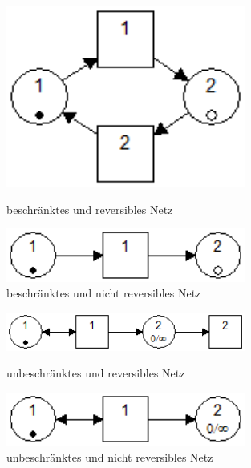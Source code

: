 \documentclass[10pt]{scrartcl}
\begin{document}
\begin{enumerate}
\begin{figure}
\begin{minipage}[hbt]{7cm}
	\centering
	\includegraphics[width=0.7\textwidth]{Bilder/3_beschraenkt_und_reversibel.png}
	\caption{beschränktes und reversibles Netz}
	\label{fig:BR}
\end{minipage}
\hfill
\begin{minipage}[hbt]{7cm}
	\centering
	\includegraphics[width=0.7\textwidth]{Bilder/3_beschraenkt_nicht_reversibel.png}
	\caption{beschränktes und nicht reversibles Netz}
	\label{fig:BnR}
\end{minipage}
\end{figure}
\begin{figure}
\begin{minipage}[hbt]{7cm}
	\centering
	\includegraphics[width=0.7\textwidth]{Bilder/3_unbeschraenkt_und_reversibel.png}
	\caption{unbeschränktes und reversibles Netz}
	\label{fig:nBR}
\end{minipage}
\hfill
\begin{minipage}[hbt]{7cm}
	\centering
	\includegraphics[width=0.7\textwidth]{Bilder/3_unbeschraenkt_nicht_reversibel.png}
	\caption{unbeschränktes und nicht reversibles Netz}
	\label{fig:nBnR}
\end{minipage}
\end{figure}


\end{enumerate}
\end{document}
